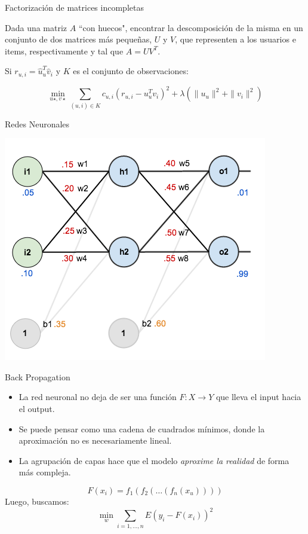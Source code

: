 \documentclass[12pt,aspectratio=169]{beamer}
\begin{document}
\begin{frame}{Factorización de matrices incompletas}

	Dada una matriz $A$ ``con huecos", encontrar la descomposición de la misma en un conjunto de dos matrices más pequeñas, $U$ y $V$, que representen a los usuarios e items, respectivamente y tal que $A = U V^T$.
	
	Si $r_{u,i} = \hat{u}_u^T\hat{v}_i$ y $K$ es el conjunto de observaciones:
	
	$$
	\min_{u\star, v\star} \sum_{(u,i) \in K}c_{u,i}(r_{u,i} - u_u^Tv_i)^2 + \lambda (\|u_u\|^2 + \|v_i\|^2)
	$$
	
\end{frame}

\begin{frame}{Redes Neuronales}
\begin{center}
	\includegraphics[width=.5\paperwidth]{neuralnet.png}
\end{center}
\end{frame}

\begin{frame}{Back Propagation}

\begin{itemize}
\item La red neuronal no deja de ser una función $F: X \rightarrow Y$ que lleva el input hacia el output.
\item Se puede pensar como una cadena de cuadrados mínimos, donde la aproximación no es necesariamente lineal.
\item La agrupación de capas hace que el modelo \textit{aproxime la realidad} de forma más compleja.
\end{itemize}

$$
F(x_i) = f_1(f_2(\dots(f_n(x_u))))
$$
Luego, buscamos:
$$
\min_w \sum_{i=1,\dots,n}E(y_i - F(x_i))^2
$$

\end{frame}
\end{document}
